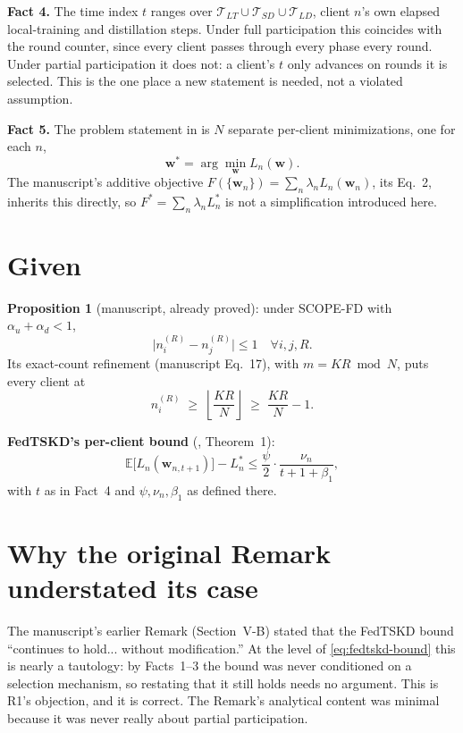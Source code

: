 \documentclass[11pt]{article}
\begin{document}
\textbf{Fact 4.} The time index $t$ ranges over $\mathcal{T}_{LT}\cup
\mathcal{T}_{SD}\cup\mathcal{T}_{LD}$, client $n$'s own elapsed
local-training and distillation steps. Under full participation this
coincides with the round counter, since every client passes through every
phase every round. Under partial participation it does not: a client's $t$
only advances on rounds it is selected. This is the one place a new
statement is needed, not a violated assumption.

\textbf{Fact 5.} The problem statement in \cite{mu2024fedtskd} is $N$
separate per-client minimizations, one for each $n$,
\[
  \bm w^{*}=\arg\min_{\bm w}L_n(\bm w).
\]
The manuscript's additive objective $F(\{\bm w_n\})=\sum_n\lambda_n
L_n(\bm w_n)$, its Eq.~2, inherits this directly, so
$F^{*}=\sum_n\lambda_n L_n^{*}$ is not a simplification introduced here.

\section{Given}

\textbf{Proposition 1} (manuscript, already proved): under SCOPE-FD with
$\alpha_u+\alpha_d<1$,
\begin{equation}
\bigl|n_i^{(R)}-n_j^{(R)}\bigr|\le 1 \quad\forall i,j,R.
\label{eq:spread}
\end{equation}
Its exact-count refinement (manuscript Eq.~17), with $m=KR\bmod N$, puts
every client at
\begin{equation}
n_i^{(R)} \;\ge\; \left\lfloor \frac{KR}{N} \right\rfloor \;\ge\; \frac{KR}{N}-1.
\label{eq:lowerbound}
\end{equation}

\textbf{FedTSKD's per-client bound} (\cite{mu2024fedtskd}, Theorem~1):
\begin{equation}
\mathbb{E}\bigl[L_n(\bm w_{n,t+1})\bigr] - L_n^{*} \le \frac{\psi}{2}\cdot\frac{\nu_n}{t+1+\beta_1},
\label{eq:fedtskd-bound}
\end{equation}
with $t$ as in Fact~4 and $\psi,\nu_n,\beta_1$ as defined there.

\section{Why the original Remark understated its case}

The manuscript's earlier Remark (Section~V-B) stated that the FedTSKD bound
``continues to hold... without modification.'' At the level of
\eqref{eq:fedtskd-bound} this is nearly a tautology: by Facts~1--3 the bound
was never conditioned on a selection mechanism, so restating that it still
holds needs no argument. This is R1's objection, and it is correct. The
Remark's analytical content was minimal because it was never really about
partial participation.
\end{document}
